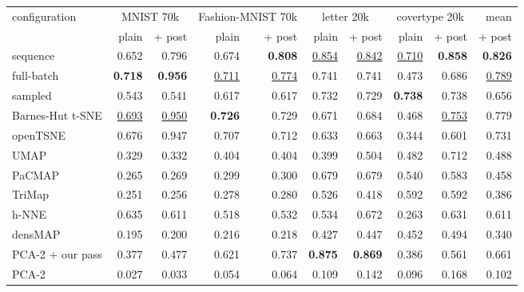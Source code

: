 \begin{tabular}{lrrrrrrrrr}
\toprule
configuration & \multicolumn{2}{c}{MNIST 70k} & \multicolumn{2}{c}{Fashion-MNIST 70k} & \multicolumn{2}{c}{letter 20k} & \multicolumn{2}{c}{covertype 20k} & mean \\
 & plain & + post & plain & + post & plain & + post & plain & + post & + post \\
\midrule
\magnet{} sequence & 0.652 & 0.796 & 0.674 & \textbf{0.808} & \underline{0.854} & \underline{0.842} & \underline{0.710} & \textbf{0.858} & \textbf{0.826} \\
\magnet{} full-batch & \textbf{0.718} & \textbf{0.956} & \underline{0.711} & \underline{0.774} & 0.741 & 0.741 & 0.473 & 0.686 & \underline{0.789} \\
\magnet{} sampled & 0.543 & 0.541 & 0.617 & 0.617 & 0.732 & 0.729 & \textbf{0.738} & 0.738 & 0.656 \\
Barnes-Hut t-SNE & \underline{0.693} & \underline{0.950} & \textbf{0.726} & 0.729 & 0.671 & 0.684 & 0.468 & \underline{0.753} & 0.779 \\
openTSNE & 0.676 & 0.947 & 0.707 & 0.712 & 0.633 & 0.663 & 0.344 & 0.601 & 0.731 \\
UMAP & 0.329 & 0.332 & 0.404 & 0.404 & 0.399 & 0.504 & 0.482 & 0.712 & 0.488 \\
PaCMAP & 0.265 & 0.269 & 0.299 & 0.300 & 0.679 & 0.679 & 0.540 & 0.583 & 0.458 \\
TriMap & 0.251 & 0.256 & 0.278 & 0.280 & 0.526 & 0.418 & 0.592 & 0.592 & 0.386 \\
h-NNE & 0.635 & 0.611 & 0.518 & 0.532 & 0.534 & 0.672 & 0.263 & 0.631 & 0.611 \\
densMAP & 0.195 & 0.200 & 0.216 & 0.218 & 0.427 & 0.447 & 0.452 & 0.494 & 0.340 \\
PCA-2 + our pass & 0.377 & 0.477 & 0.621 & 0.737 & \textbf{0.875} & \textbf{0.869} & 0.386 & 0.561 & 0.661 \\
PCA-2 & 0.027 & 0.033 & 0.054 & 0.064 & 0.109 & 0.142 & 0.096 & 0.168 & 0.102 \\
\bottomrule
\end{tabular}
